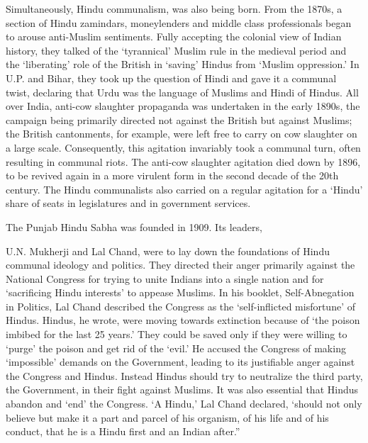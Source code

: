 Simultaneously, Hindu communalism, was also being born. From the 1870s, a section of Hindu zamindars, moneylenders and middle class professionals began to arouse anti-Muslim sentiments. Fully accepting the colonial view of Indian history, they talked of the ‘tyrannical’ Muslim rule in the medieval period and the ‘liberating’ role of the British in ‘saving’ Hindus from ‘Muslim oppression.’ In U.P. and Bihar, they took up the question of Hindi and gave it a communal twist, declaring that Urdu was the language of Muslims and Hindi of Hindus. All over India, anti-cow slaughter propaganda was undertaken in the early 1890s, the campaign being primarily directed not against the British but against Muslims; the British cantonments, for example, were left free to carry on cow slaughter on a large scale. Consequently, this agitation invariably took a communal turn, often resulting in communal riots. The anti-cow slaughter agitation died down by 1896, to be revived again in a more virulent form in the second decade of the 20th century. The Hindu communalists also carried on a regular agitation for a ‘Hindu’ share of seats in legislatures and in government services. 

The Punjab Hindu Sabha was founded in 1909. Its leaders, 

U.N. Mukherji and Lal Chand, were to lay down the foundations of Hindu communal ideology and politics. They directed their anger primarily against the National Congress for trying to unite Indians into a single nation and for ‘sacrificing Hindu interests’ to appease Muslims. In his booklet, Self-Abnegation in Politics, Lal Chand described the Congress as the ‘self-inflicted misfortune’ of Hindus. Hindus, he wrote, were moving towards extinction because of ‘the poison imbibed for the last 25 years.’ They could be saved only if they were willing to ‘purge’ the poison and get rid of the ‘evil.’ He accused the Congress of making ‘impossible’ demands on the Government, leading to its justifiable anger against the Congress and Hindus. Instead Hindus should try to neutralize the third party, the Government, in their fight against Muslims. It was also essential that Hindus abandon and ‘end’ the Congress. ‘A Hindu,’ Lal Chand declared, ‘should not only believe but make it a part and parcel of his organism, of his life and of his conduct, that he is a Hindu first and an Indian after.” 

